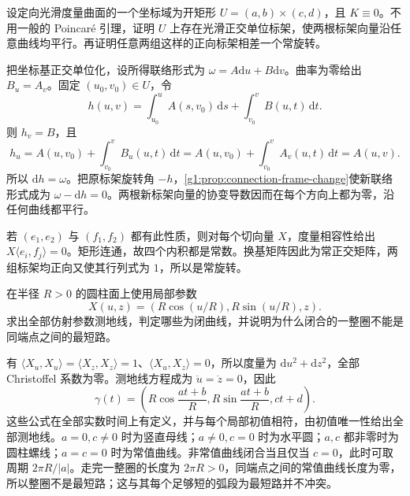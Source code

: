 \begin{exercise}\label{g1:ex:flat-rectangle-frame}
	设定向光滑度量曲面的一个坐标域为开矩形 \(U=(a,b)\times(c,d)\)，且 \(K\equiv0\)。不用一般的 Poincar\'e 引理，证明 \(U\) 上存在光滑正交单位标架，使两根标架向量沿任意曲线均平行。再证明任意两组这样的正向标架相差一个常旋转。
\end{exercise}
\begin{solution}
	把坐标基正交单位化，设所得联络形式为 \(\omega=A\mathrm{d}u+B\mathrm{d}v\)。曲率为零给出 \(B_u=A_v\)。固定 \((u_0,v_0)\in U\)，令
	\[
		h(u,v)=\int_{u_0}^uA(s,v_0)\,\mathrm{d}s+\int_{v_0}^vB(u,t)\,\mathrm{d}t.
	\]
	则 \(h_v=B\)，且
	\[
		h_u=A(u,v_0)+\int_{v_0}^v B_u(u,t)\,\mathrm{d}t
		=A(u,v_0)+\int_{v_0}^v A_v(u,t)\,\mathrm{d}t=A(u,v).
	\]
	所以 \(\mathrm{d}h=\omega\)。把原标架旋转角 \(-h\)，\cref{g1:prop:connection-frame-change}使新联络形式成为 \(\omega-\mathrm{d}h=0\)。两根新标架向量的协变导数因而在每个方向上都为零，沿任何曲线都平行。

	若 \((e_1,e_2)\) 与 \((f_1,f_2)\) 都有此性质，则对每个切向量 \(X\)，度量相容性给出 \(X\langle e_i,f_j\rangle=0\)。矩形连通，故四个内积都是常数。换基矩阵因此为常正交矩阵，两组标架均正向又使其行列式为 \(1\)，所以是常旋转。
\end{solution}

\begin{exercise}
	\label{g1:ex:cylinder-geodesics}
	在半径 \(R>0\) 的圆柱面上使用局部参数
	\[
		X(u,z)=(R\cos(u/R),R\sin(u/R),z).
	\]
	求出全部仿射参数测地线，判定哪些为闭曲线，并说明为什么闭合的一整圈不能是同端点之间的最短路。
\end{exercise}
\begin{solution}
	有 \(\langle X_u,X_u\rangle=\langle X_z,X_z\rangle=1\)、\(\langle X_u,X_z\rangle=0\)，所以度量为 \(\mathrm{d}u^2+\mathrm{d}z^2\)，全部 Christoffel 系数为零。测地线方程成为 \(\ddot u=\ddot z=0\)，因此
	\[
		\gamma(t)=\left(R\cos\frac{at+b}{R},R\sin\frac{at+b}{R},ct+d\right).
	\]
	这些公式在全部实数时间上有定义，并与每个局部初值相符，由初值唯一性给出全部测地线。\(a=0,c\ne0\) 时为竖直母线；\(a\ne0,c=0\) 时为水平圆；\(a,c\) 都非零时为圆柱螺线；\(a=c=0\) 时为常值曲线。非常值曲线闭合当且仅当 \(c=0\)，此时可取周期 \(2\pi R/|a|\)。走完一整圈的长度为 \(2\pi R>0\)，同端点之间的常值曲线长度为零，所以整圈不是最短路；这与其每个足够短的弧段为最短路并不冲突。
\end{solution}

